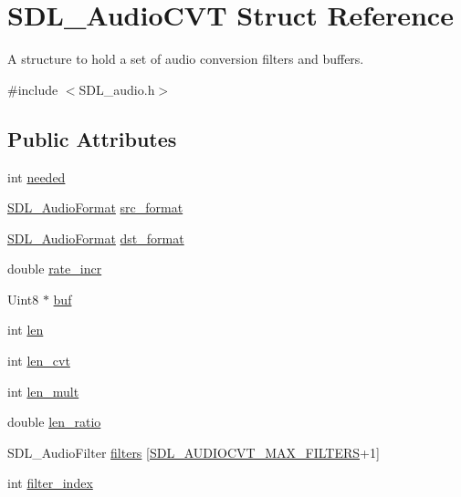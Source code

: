 \hypertarget{struct_s_d_l___audio_c_v_t}{}\section{S\+D\+L\+\_\+\+Audio\+C\+VT Struct Reference}
\label{struct_s_d_l___audio_c_v_t}


A structure to hold a set of audio conversion filters and buffers.  




{\ttfamily \#include $<$S\+D\+L\+\_\+audio.\+h$>$}

\subsection*{Public Attributes}
\begin{DoxyCompactItemize}
\item 
int \mbox{\hyperlink{struct_s_d_l___audio_c_v_t_ac600a035a48df05e14d3712fd6953ad4}{needed}}
\item 
\mbox{\hyperlink{_s_d_l__audio_8h_a491ed103fd25d920c4e6b7495217ce66}{S\+D\+L\+\_\+\+Audio\+Format}} \mbox{\hyperlink{struct_s_d_l___audio_c_v_t_a6ae81231e017105e6d5e745a51732e16}{src\+\_\+format}}
\item 
\mbox{\hyperlink{_s_d_l__audio_8h_a491ed103fd25d920c4e6b7495217ce66}{S\+D\+L\+\_\+\+Audio\+Format}} \mbox{\hyperlink{struct_s_d_l___audio_c_v_t_a8f890d017be857a3b048bf00525736c6}{dst\+\_\+format}}
\item 
double \mbox{\hyperlink{struct_s_d_l___audio_c_v_t_ad886122c23a6673073baace31bff3b6c}{rate\+\_\+incr}}
\item 
Uint8 $\ast$ \mbox{\hyperlink{struct_s_d_l___audio_c_v_t_a080db27b929efa983c5161360ffce310}{buf}}
\item 
int \mbox{\hyperlink{struct_s_d_l___audio_c_v_t_aeaeb8c5a63c3ab96471fbfdf412c78ff}{len}}
\item 
int \mbox{\hyperlink{struct_s_d_l___audio_c_v_t_a5c60163f34d1947e5b166c23aba9879d}{len\+\_\+cvt}}
\item 
int \mbox{\hyperlink{struct_s_d_l___audio_c_v_t_ac9662d47cf2348b82b27b151150116b0}{len\+\_\+mult}}
\item 
double \mbox{\hyperlink{struct_s_d_l___audio_c_v_t_a5628ff5ccf711de9d77c0a4a9f57d2f0}{len\+\_\+ratio}}
\item 
S\+D\+L\+\_\+\+Audio\+Filter \mbox{\hyperlink{struct_s_d_l___audio_c_v_t_afeb8dc60716644de3b681653442de1db}{filters}} \mbox{[}\mbox{\hyperlink{_s_d_l__audio_8h_a3d38380ac4a45a68a0e1c1a7a02bd290}{S\+D\+L\+\_\+\+A\+U\+D\+I\+O\+C\+V\+T\+\_\+\+M\+A\+X\+\_\+\+F\+I\+L\+T\+E\+RS}}+1\mbox{]}
\item 
int \mbox{\hyperlink{struct_s_d_l___audio_c_v_t_a35093b3ad3331c17416c593a76012b63}{filter\+\_\+index}}
\end{DoxyCompactItemize}


